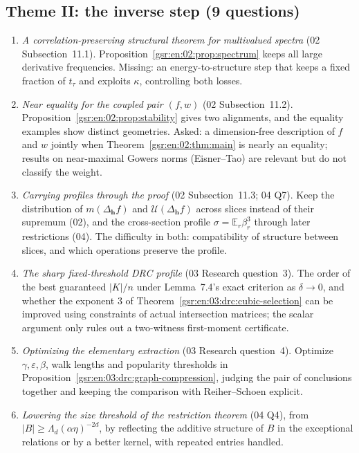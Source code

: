 \documentclass[11pt,letterpaper]{article}
\numberwithin{equation}{section}
\theoremstyle{definition}
\theoremstyle{remark}
\newcommand{\E}{\mathbb E}
\newcommand{\1}{\mathbf 1}
\newcommand{\U}{\mathcal U}
\begin{document}
\subsection*{Theme II: the inverse step (9 questions)}
\begin{enumerate}[label=\textbf{II.\arabic*},ref=II.\arabic*,leftmargin=2.6em]
\item\label{gsr:fz:q:II:structure} \emph{A correlation-preserving structural theorem for multivalued spectra} (02 Subsection~11.1). Proposition~\ref{gsr:en:02:prop:spectrum} keeps all large derivative frequencies. Missing: an energy-to-structure step that keeps a fixed fraction of $t_\tau$ and exploits $\kappa$, controlling both losses.
\item\label{gsr:fz:q:II:near} \emph{Near equality for the coupled pair $(f,w)$} (02 Subsection~11.2). Proposition~\ref{gsr:en:02:prop:stability} gives two alignments, and the equality examples show distinct geometries. Asked: a dimension-free description of $f$ and $w$ jointly when Theorem~\ref{gsr:en:02:thm:main} is nearly an equality; results on near-maximal Gowers norms (Eisner--Tao) are relevant but do not classify the weight.
\item\label{gsr:fz:q:II:profiles} \emph{Carrying profiles through the proof} (02 Subsection~11.3; 04 Q7). Keep the distribution of $m(\Delta_{\mathbf h}f)$ and $\U(\Delta_{\mathbf h}f)$ across slices instead of their supremum (02), and the cross-section profile $\sigma=\E_r\beta_r^3$ through later restrictions (04). The difficulty in both: compatibility of structure between slices, and which operations preserve the profile.
\item\label{gsr:fz:q:II:drc} \emph{The sharp fixed-threshold DRC profile} (03 Research question~3). The order of the best guaranteed $|K|/n$ under Lemma~7.4's exact criterion as $\delta\to0$, and whether the exponent $3$ of Theorem~\ref{gsr:en:03:drc:cubic-selection} can be improved using constraints of actual intersection matrices; the scalar argument only rules out a two-witness first-moment certificate.
\item\label{gsr:fz:q:II:extraction} \emph{Optimizing the elementary extraction} (03 Research question~4). Optimize $\gamma,\varepsilon,\beta$, walk lengths and popularity thresholds in Proposition~\ref{gsr:en:03:drc:graph-compression}, judging the pair of conclusions together and keeping the comparison with Reiher--Schoen explicit.
\item\label{gsr:fz:q:II:threshold} \emph{Lowering the size threshold of the restriction theorem} (04 Q4), from $|B|\ge\Lambda_d(\alpha\eta)^{-2d}$, by reflecting the additive structure of $B$ in the exceptional relations or by a better kernel, with repeated entries handled.

\end{enumerate}
\end{document}
